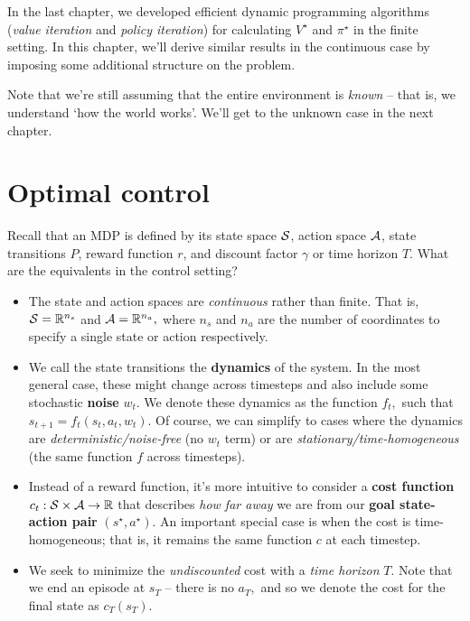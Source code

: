 \documentclass[../main/main]{subfiles}
\begin{document}
In the last chapter, we developed efficient dynamic programming algorithms (\emph{value iteration} and \emph{policy iteration})
for calculating $V^\star$ and $\pi^\star$ in the finite setting.
In this chapter, we'll derive similar results in the continuous case by imposing
some additional structure on the problem.

Note that we're still assuming that the entire environment is \emph{known} --
that is, we understand `how the world works'. We'll get to the unknown case in the next chapter.

\section{Optimal control}

Recall that an MDP is defined by its state space $\S$, action space $\A$, state transitions $P$, reward function $r$, and discount factor $\gamma$ or time horizon $T$. What are the equivalents in the control setting?

\begin{itemize}
    \item The state and action spaces are \emph{continuous} rather than finite. That is, $\S = \R^{n_s}$ and $\A = \R^{n_a},$ where $n_s$ and $n_a$ are the number of coordinates to specify a single state or action respectively.
    \item We call the state transitions the \textbf{dynamics} of the system. In the most general case, these might change across timesteps and also include some stochastic \textbf{noise} $w_t.$ We denote these dynamics as the function $f_t,$ such that $s_{t+1} = f_t(s_t, a_t, w_t).$ Of course, we can simplify to cases where the dynamics are \emph{deterministic/noise-free} (no $w_t$ term) or are \emph{stationary/time-homogeneous} (the same function $f$ across timesteps).
    \item Instead of a reward function, it's more intuitive to consider a \textbf{cost function} $c_t: \S \times \A \to \R$ that describes \emph{how far away} we are from our \textbf{goal state-action pair} $(s^\star, a^\star)$. An important special case is when the cost is time-homogeneous; that is, it remains the same function $c$ at each timestep.
    \item We seek to minimize the \emph{undiscounted} cost with a \emph{time horizon} $T$. Note that we end an episode at $s_T$ -- there is no $a_T,$ and so we denote the cost for the final state as $c_T(s_T).$
\end{itemize}
\end{document}
